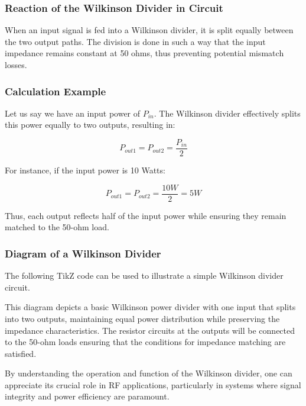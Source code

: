 \subsubsection{Reaction of the Wilkinson Divider in Circuit}

When an input signal is fed into a Wilkinson divider, it is split equally between the two output paths. The division is done in such a way that the input impedance remains constant at 50 ohms, thus preventing potential mismatch losses. 

\subsubsection{Calculation Example}

Let us say we have an input power of \( P_{in} \). The Wilkinson divider effectively splits this power equally to two outputs, resulting in:

\[
P_{out1} = P_{out2} = \frac{P_{in}}{2}
\]

For instance, if the input power is 10 Watts:

\[
P_{out1} = P_{out2} = \frac{10W}{2} = 5W
\]

Thus, each output reflects half of the input power while ensuring they remain matched to the 50-ohm load.

\subsubsection{Diagram of a Wilkinson Divider}

The following TikZ code can be used to illustrate a simple Wilkinson divider circuit. 

\begin{center}
\end{center}

This diagram depicts a basic Wilkinson power divider with one input that splits into two outputs, maintaining equal power distribution while preserving the impedance characteristics. The resistor circuits at the outputs will be connected to the 50-ohm loads ensuring that the conditions for impedance matching are satisfied.

By understanding the operation and function of the Wilkinson divider, one can appreciate its crucial role in RF applications, particularly in systems where signal integrity and power efficiency are paramount.
